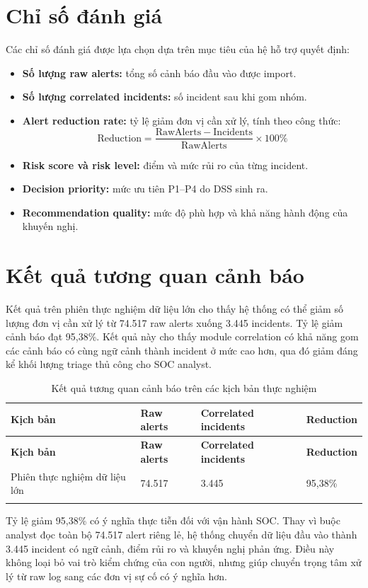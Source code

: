 \documentclass[a4paper,12pt,oneside]{book}
\begin{document}
\section{Chỉ số đánh giá}
{\fontsize{13pt}{15.6pt}\selectfont

Các chỉ số đánh giá được lựa chọn dựa trên mục tiêu của hệ hỗ trợ quyết định:

\begin{itemize}
    \item \textbf{Số lượng raw alerts:} tổng số cảnh báo đầu vào được import.
    \item \textbf{Số lượng correlated incidents:} số incident sau khi gom nhóm.
    \item \textbf{Alert reduction rate:} tỷ lệ giảm đơn vị cần xử lý, tính theo công thức:
    \[
    \mathrm{Reduction} = \frac{\mathrm{RawAlerts} - \mathrm{Incidents}}{\mathrm{RawAlerts}} \times 100\%
    \]
    \item \textbf{Risk score và risk level:} điểm và mức rủi ro của từng incident.
    \item \textbf{Decision priority:} mức ưu tiên P1--P4 do DSS sinh ra.
    \item \textbf{Recommendation quality:} mức độ phù hợp và khả năng hành động của khuyến nghị.
\end{itemize}

}

\section{Kết quả tương quan cảnh báo}
{\fontsize{13pt}{15.6pt}\selectfont

Kết quả trên phiên thực nghiệm dữ liệu lớn cho thấy hệ thống có thể giảm số lượng đơn vị cần xử lý từ 74.517 raw alerts xuống 3.445 incidents. Tỷ lệ giảm cảnh báo đạt 95,38\%. Kết quả này cho thấy module correlation có khả năng gom các cảnh báo có cùng ngữ cảnh thành incident ở mức cao hơn, qua đó giảm đáng kể khối lượng triage thủ công cho SOC analyst.

\begin{longtable}{|L{4.0cm}|C{2.6cm}|C{3.3cm}|C{2.5cm}|}
\hline
\textbf{Kịch bản} & \textbf{Raw alerts} & \textbf{Correlated incidents} & \textbf{Reduction} \\
\hline
\endfirsthead
\hline
\textbf{Kịch bản} & \textbf{Raw alerts} & \textbf{Correlated incidents} & \textbf{Reduction} \\
\hline
\endhead
Phiên thực nghiệm dữ liệu lớn & 74.517 & 3.445 & 95,38\% \\
\hline
\caption{Kết quả tương quan cảnh báo trên các kịch bản thực nghiệm}\label{tab:correlation-results}\\
\end{longtable}

\noindent Tỷ lệ giảm 95,38\% có ý nghĩa thực tiễn đối với vận hành SOC. Thay vì buộc analyst đọc toàn bộ 74.517 alert riêng lẻ, hệ thống chuyển dữ liệu đầu vào thành 3.445 incident có ngữ cảnh, điểm rủi ro và khuyến nghị phản ứng. Điều này không loại bỏ vai trò kiểm chứng của con người, nhưng giúp chuyển trọng tâm xử lý từ raw log sang các đơn vị sự cố có ý nghĩa hơn.

}
\end{document}
